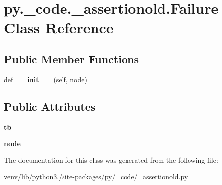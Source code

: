 \hypertarget{classpy_1_1__code_1_1__assertionold_1_1_failure}{}\section{py.\+\_\+code.\+\_\+assertionold.\+Failure Class Reference}
\label{classpy_1_1__code_1_1__assertionold_1_1_failure}
\subsection*{Public Member Functions}
\begin{DoxyCompactItemize}
\item 
\mbox{\label{classpy_1_1__code_1_1__assertionold_1_1_failure_a6785e1446295a730b933a9aa305bd6db}} 
def {\bfseries \+\_\+\+\_\+init\+\_\+\+\_\+} (self, node)
\end{DoxyCompactItemize}
\subsection*{Public Attributes}
\begin{DoxyCompactItemize}
\item 
\mbox{\label{classpy_1_1__code_1_1__assertionold_1_1_failure_a2be27bac242d6b0bbda7eee2cd2e1084}} 
{\bfseries tb}
\item 
\mbox{\label{classpy_1_1__code_1_1__assertionold_1_1_failure_a860d887a1cbf29c359dd4873830886dc}} 
{\bfseries node}
\end{DoxyCompactItemize}


The documentation for this class was generated from the following file\+:\begin{DoxyCompactItemize}
\item 
venv/lib/python3./site-\/packages/py/\+\_\+code/\+\_\+assertionold.\+py\end{DoxyCompactItemize}
